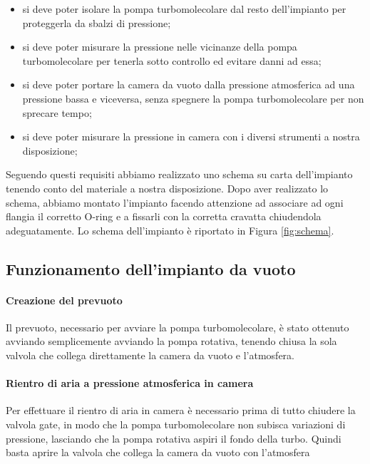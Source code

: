 \begin{itemize}
	\item{si deve poter isolare la pompa turbomolecolare dal resto dell'impianto per proteggerla da sbalzi di pressione;}
	\item{si deve poter misurare la pressione nelle vicinanze della pompa turbomolecolare per tenerla sotto controllo ed evitare danni ad essa;}	
	\item{si deve poter portare la camera da vuoto dalla pressione atmosferica ad una pressione bassa e viceversa, senza spegnere la pompa turbomolecolare per non sprecare tempo;}
	\item{si deve poter misurare la pressione in camera con i diversi strumenti a nostra disposizione;}
\end{itemize}

Seguendo questi requisiti abbiamo realizzato uno schema su carta dell'impianto tenendo conto del materiale a nostra disposizione. Dopo aver realizzato lo schema, abbiamo montato l'impianto facendo attenzione ad associare ad ogni flangia il corretto O-ring e a fissarli con la corretta cravatta chiudendola adeguatamente. Lo schema dell'impianto è riportato in Figura \ref{fig:schema}.

\subsection{Funzionamento dell'impianto da vuoto}
\paragraph{Creazione del prevuoto\\}
Il prevuoto, necessario per avviare la pompa turbomolecolare, è stato ottenuto avviando semplicemente avviando la pompa rotativa, tenendo chiusa la sola valvola che collega direttamente la camera da vuoto e l'atmosfera.
\paragraph{Rientro di aria a pressione atmosferica in camera\\}
Per effettuare il rientro di aria in camera è necessario prima di tutto chiudere la valvola gate, in modo che la pompa turbomolecolare non subisca variazioni di pressione, lasciando che la pompa rotativa aspiri il fondo della turbo. Quindi basta aprire la valvola che collega la camera da vuoto con l'atmosfera
